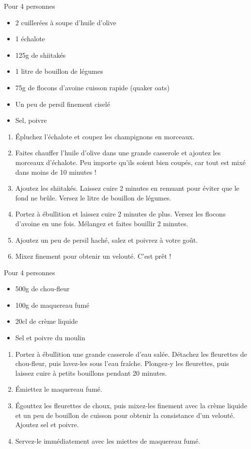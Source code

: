 \bigskip
{}
{Pour 4 personnes}{\begin{itemize}
	\item 2 cuillerées à soupe d'huile d'olive
	\item 1 échalote
	\item 125g de shiitakés
	\item 1 litre de bouillon de légumes
	\item 75g de flocons d'avoine cuisson rapide (quaker oats) 
	\item Un peu de persil finement ciselé
	\item Sel, poivre
\end{itemize}}
{\begin{enumerate}
	\item Épluchez l'échalote et coupez les champignons en morceaux.
	\item Faites chauffer l'huile d'olive dans une grande casserole et ajoutez les morceaux d'échalote. Peu importe qu'ils soient bien coupés, car tout est mixé dans moins de 10 minutes ! 
	\item Ajoutez les shiitakés. Laissez cuire 2 minutes en remuant pour éviter que le fond ne brûle. Versez le litre de bouillon de légumes.
	\item Portez à ébullition et laissez cuire 2 minutes de plus. Versez les flocons d'avoine en une fois. Mélangez et faites bouillir 2 minutes.
	\item Ajoutez un peu de persil haché, salez et poivrez à votre goût.
	\item Mixez finement pour obtenir un velouté. C'est prêt !
\end{enumerate}}

\bigskip
{}
{Pour 4 personnes}{\begin{itemize}
	\item 500g de chou-fleur
	\item 100g de maquereau fumé
	\item 20cl de crème liquide
	\item Sel et poivre du moulin
\end{itemize}}
{\begin{enumerate}
	\item Portez à ébullition une grande casserole d'eau salée. Détachez les fleurettes de chou-fleur, puis lavez-les sous l'eau fraîche. Plongez-y les fleurettes, puis laissez cuire à petits bouillons pendant 20 minutes.
	\item Émiettez le maquereau fumé.
	\item Égouttez les fleurettes de choux, puis mixez-les finement avec la crème liquide et un peu de bouillon de cuisson pour obtenir la consistance d'un velouté. Ajoutez sel et poivre.
	\item Servez-le immédiatement avec les miettes de maquereau fumé.
\end{enumerate}}
